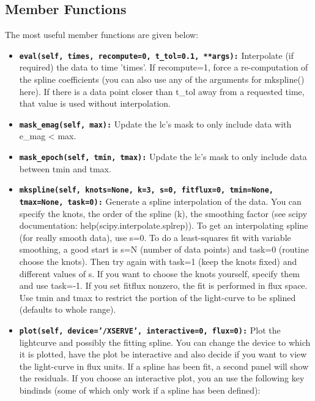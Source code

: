 \documentclass[12pt]{article}
\begin{document}
\subsection{Member Functions\label{sub:LCMember-Functions}}

The most useful member functions are given below:

\begin{itemize}
\item \texttt{\textbf{eval(self, times, recompute=0, t\_tol=0.1, {*}{*}args):}}
Interpolate (if required) the data to time 'times'. If recompute=1,
force a re-computation of the spline coefficients (you can also use
any of the arguments for mkspline() here). If there is a data point
closer than t\_tol away from a requested time, that value is used
without interpolation. 
\item \texttt{\textbf{mask\_emag(self, max):}} Update the lc's mask to only
include data with e\_mag < max. 
\item \texttt{\textbf{mask\_epoch(self, tmin, tmax):}} Update the lc's mask
to only include data between tmin and tmax.
\item \texttt{\textbf{mkspline(self, knots=None, k=3, s=0, fitflux=0, tmin=None,
tmax=None, task=0):}} Generate a spline interpolation of the data.
You can specify the knots, the order of the spline (k), the smoothing
factor (see scipy documentation: help(scipy.interpolate.splrep)).
To get an interpolating spline (for really smooth data), use s=0.
To do a least-squares fit with variable smoothing, a good start is
s=N (number of data points) and task=0 (routine choose the knots).
Then try again with task=1 (keep the knots fixed) and different values
of s. If you want to choose the knots yourself, specify them and use
task=-1. If you set fitflux nonzero, the fit is performed in flux
space. Use tmin and tmax to restrict the portion of the light-curve
to be splined (defaults to whole range). 
\item \texttt{\textbf{plot(self, device='/XSERVE', interactive=0, flux=0):}}
Plot the lightcurve and possibly the fitting spline. You can change
the device to which it is plotted, have the plot be interactive and
also decide if you want to view the light-curve in flux units. If
a spline has been fit, a second panel will show the residuals. If
you choose an interactive plot, you an use the following key bindinds
(some of which only work if a spline has been defined): 


\end{itemize}
\end{document}
